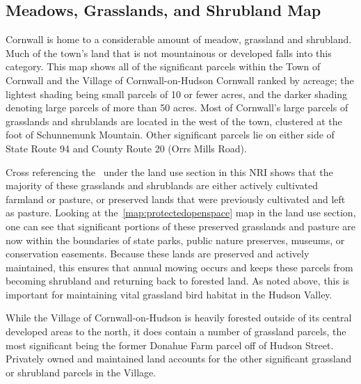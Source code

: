 \subsection*{Meadows, Grasslands, and Shrubland Map}
Cornwall is home to a considerable amount of meadow, grassland and shrubland.
Much of the town’s land that is not mountainous or developed falls into this
category. This map shows all of the significant parcels within the Town of
Cornwall and the Village of Cornwall-on-Hudson Cornwall ranked by acreage; the
lightest shading being small parcels of 10 or fewer acres, and the darker
shading denoting large parcels of more than 50 acres. Most of Cornwall's large
parcels of grasslands and shrublands are located in the west of the town,
clustered at the foot of Schunnemunk Mountain. Other significant parcels lie on
either side of State Route 94 and County Route 20 (Orrs Mills Road).
\par
Cross referencing the~ under the land use section in
this NRI shows that the majority of these grasslands and shrublands are either
actively cultivated farmland or pasture, or preserved lands that were
previously cultivated and left as pasture. Looking at the~\ref{map:protectedopenspace}
map in the land use section, one can see that significant portions
of these preserved grasslands and pasture are now within the boundaries of
state parks, public nature preserves, museums, or conservation easements.
Because these lands are preserved and actively maintained, this ensures that
annual mowing occurs and keeps these parcels from becoming shrubland and
returning back to forested land. As noted above, this is important for
maintaining vital grassland bird habitat in the Hudson Valley.
\par
While the Village of Cornwall-on-Hudson is heavily forested outside of its
central developed areas to the north, it does contain a number of grassland
parcels, the most significant being the former Donahue Farm parcel off of
Hudson Street. Privately owned and maintained land accounts for the other
significant grassland or shrubland parcels in the Village.
~\label{map:meadowgrasslandsandshrublands}
